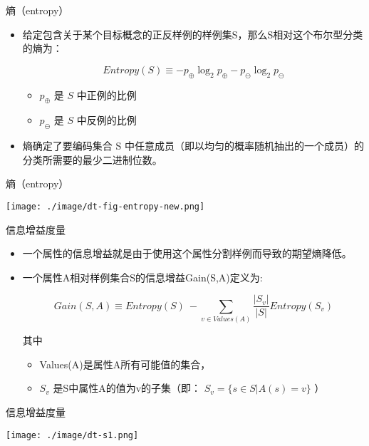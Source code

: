 \documentclass[presentation]{beamer}
\begin{document}
\begin{frame}[label={sec:org9364223}]{熵（entropy）}
\begin{itemize}
\item 给定包含关于某个目标概念的正反样例的样例集S，那么S相对这个布尔型分类的熵为：

\[ Entropy(S) \equiv  - p_{\oplus} \log_{2} p_{\oplus} -  p_{\ominus} \log_{2}p_{\ominus} \]

\begin{itemize}
\item \(p_{\oplus}\) 是 \(S\) 中正例的比例
\item \(p_{\ominus}\) 是 \(S\) 中反例的比例
\end{itemize}

\item 熵确定了要编码集合 S 中任意成员（即以均匀的概率随机抽出的一个成员）的分类所需要的最少二进制位数。
\end{itemize}
\end{frame}

\begin{frame}[label={sec:org39c7368}]{熵（entropy）}
\center
\begin{center}
\texttt{[image: ./image/dt-fig-entropy-new.png]}
\end{center}
\end{frame}


\begin{frame}[label={sec:org3b3c117}]{信息增益度量}
\begin{itemize}
\item 一个属性的信息增益就是由于使用这个属性分割样例而导致的期望熵降低。
\item 一个属性A相对样例集合S的信息增益Gain(S,A)定义为:

\[ Gain(S,A) \equiv Entropy(S)\ - \sum_{v \in Values(A)} \frac{|S_{v}|}{|S|}Entropy(S_{v}) \]

其中 
\begin{itemize}
\item Values(A)是属性A所有可能值的集合，
\item \(S_v\) 是S中属性A的值为v的子集（即： \(S_v=\{s\in S|A(s)=v\}\) ）
\end{itemize}
\end{itemize}
\end{frame}

\begin{frame}[label={sec:orgcf6304f}]{信息增益度量}
\begin{center}
\texttt{[image: ./image/dt-s1.png]}
\end{center}
\end{frame}
\end{document}
